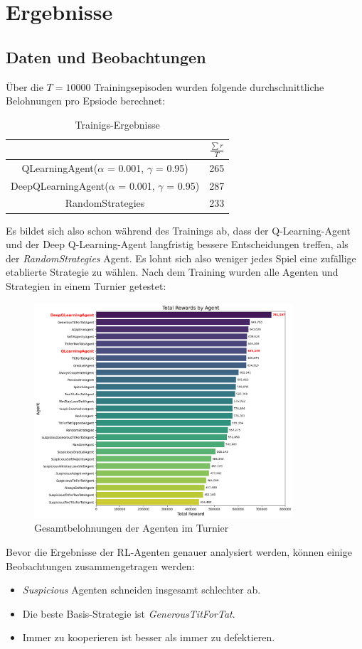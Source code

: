 \chapter{Ergebnisse}
\section{Daten und Beobachtungen}
Über die $T = 10000$ Trainingsepisoden wurden folgende durchschnittliche Belohnungen pro Epsiode berechnet:
\begin{table}[H]
    \centering
    \begin{tabular}{c|c}
            & $\frac{\sum r}{T}$ \\
        \hline
        QLearningAgent($\alpha$ = 0.001, $\gamma$ = 0.95)  & 265 \\
        \hline
        DeepQLearningAgent($\alpha$ = 0.001, $\gamma$ = 0.95) & 287 \\
        \hline
        RandomStrategies & 233
    \end{tabular}
    \caption{Trainigs-Ergebnisse}
    \label{table:trainingsergebnisse}
\end{table}
Es bildet sich also schon während des Trainings ab, dass der Q-Learning-Agent und der Deep Q-Learning-Agent langfristig
bessere Entscheidungen treffen, als der \textit{RandomStrategies} Agent. Es lohnt sich also weniger jedes Spiel
eine zufällige etablierte Strategie zu wählen.
Nach dem Training wurden alle Agenten und Strategien in einem Turnier getestet:
\begin{figure}[H]
    \centering
    \includegraphics[height=8cm]{../poster/logos/tournament.png}
    \caption{Gesamtbelohnungen der Agenten im Turnier}
    \label{fig:gesamtbelohnungen}
\end{figure}
Bevor die Ergebnisse der RL-Agenten genauer analysiert werden, können einige Beobachtungen zusammengetragen werden:
\begin{itemize}
    \item \textit{Suspicious} Agenten schneiden insgesamt schlechter ab.
    \item Die beste Basis-Strategie ist \textit{GenerousTitForTat}.
    \item Immer zu kooperieren ist besser als immer zu defektieren.
\end{itemize}

